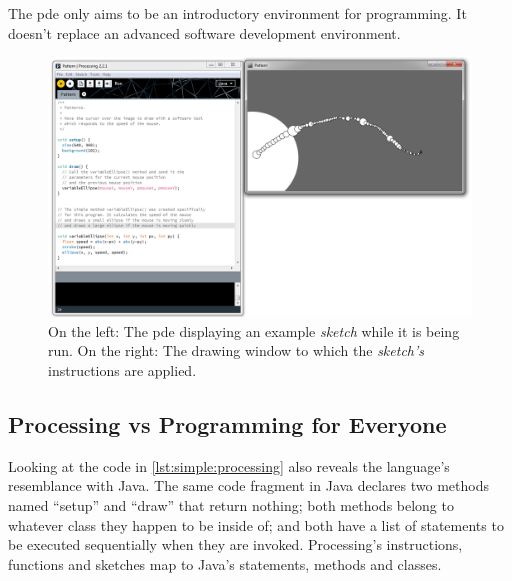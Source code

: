 \documentclass{./llncs2e/llncs}
\begin{document}
	The \ac{pde} only aims to be an introductory environment for programming. It doesn't replace an advanced software development environment.

	\begin{figure}
	  \centering
	  \includegraphics[width=1.0\textwidth]{img/proc_dev_env}
	    \caption{On the left: The \ac{pde} displaying an example \emph{sketch} while it is being run. On the right: The drawing window to which the \emph{sketch's} instructions are applied.}
	  \label{fig:proc:dev:env}
	\end{figure} 

\subsection{Processing vs Programming for Everyone}
	Looking at the code in \ref{lst:simple:processing} also reveals the language's resemblance with Java. The same code fragment in Java declares two methods named ``setup'' and ``draw'' that return nothing; both methods belong to whatever class they happen to be inside of; and both have a list of statements to be executed sequentially when they are invoked. Processing's instructions, functions and sketches map to Java's statements, methods and classes.

\end{document}
